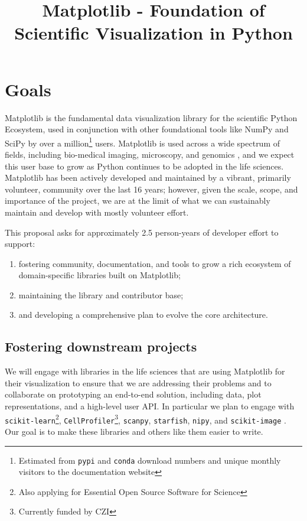 \documentclass[11pt,letterpaper]{article}  %
\begin{document}
\title{Matplotlib - Foundation of Scientific Visualization in Python}
\author{}
\maketitle

\section{Goals}

Matplotlib\cite{Hunter:2007} is the fundamental
data visualization library for the scientific Python Ecosystem, used
in conjunction with other foundational tools like NumPy and
SciPy \cite{Jones2001} by over a million\footnote{Estimated from \texttt{pypi}
and \texttt{conda} download numbers and unique monthly visitors to the documentation website} users.
Matplotlib is used across a wide spectrum of fields, including bio-medical imaging,
microscopy, and genomics \cite{Carpenter2006,Wolf2018,10.7717/peerj.453,
  Segata2011,10.1371/journal.pgen.1000695,HASHIMSHONY2012666,
  10.1093/bioinformatics/bts480,Carlile2014,Laganowsky2014,Jiangaac9462,
  10.3389/fninf.2014.00014}, and we expect this user base to grow as Python
  continues to be adopted in the life sciences. %
Matplotlib has been actively developed and maintained by a vibrant,
primarily volunteer, community over the last 16 years; however, given
the scale, scope, and importance of the project, we are at the limit
of what we can sustainably maintain and develop with mostly
volunteer effort.

This proposal asks for approximately 2.5 person-years of developer effort to support:

\begin{enumerate}[label=\alph*),noitemsep]
  \item fostering community, documentation, and tools to grow a rich ecosystem of domain-specific libraries built on Matplotlib;
  \item maintaining the library and contributor base;
  \item and developing a comprehensive plan to evolve the core architecture.
\end{enumerate}

\subsection{Fostering downstream projects}
\label{sec:downstream}
We will engage with libraries in the life sciences that are using
Matplotlib for their visualization to ensure that we are addressing
their problems and to collaborate on prototyping an end-to-end
solution, including data, plot representations, and a high-level user
API.  In particular we plan to engage with
\texttt{scikit-learn}\footnote{Also applying for Essential Open Source
Software for Science}, \texttt{CellProfiler}\footnote{Currently funded
by CZI\label{f:czi}}, \texttt{scanpy},
\texttt{starfish}, \texttt{nipy}, and
\texttt{scikit-image}
\cite{10.7717/peerj.453,Carpenter2006, Wolf2018}.
Our goal is to make these libraries and others like them easier to
write.
\end{document}
